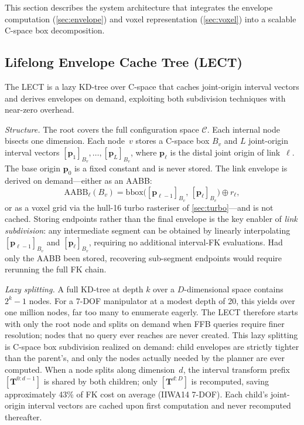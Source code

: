 \documentclass[journal]{IEEEtran}
\newcommand{\Cspace}{\mathcal{C}}
\newcommand{\AABB}{\text{AABB}}
\newcommand{\bT}{\mathbf{T}}
\begin{document}
This section describes the system architecture that integrates
the envelope computation (\cref{sec:envelope}) and voxel representation
(\cref{sec:voxel}) into a scalable C-space box decomposition.

\subsection{Lifelong Envelope Cache Tree (LECT)}\label{sec:lect}

The LECT is a lazy KD-tree over C-space that caches joint-origin
interval vectors and derives envelopes on demand,
exploiting both subdivision techniques with near-zero overhead.

\emph{Structure.}
The root covers the full configuration space $\Cspace$.
Each internal node bisects one dimension.
Each node~$v$ stores a C-space box $B_v$ and $L$ joint-origin
interval vectors $[\bm{p}_1]_{B_v},\ldots,[\bm{p}_L]_{B_v}$,
where $\bm{p}_\ell$ is the distal joint origin of link~$\ell$.
The base origin $\bm{p}_0$ is a fixed constant and is never stored.
The link envelope is derived on demand---either as an AABB:
\begin{equation}\label{eq:lect_aabb}
  \AABB_\ell(B_v)=\mathrm{bbox}\!\bigl([\bm{p}_{\ell-1}]_{B_v},\,[\bm{p}_\ell]_{B_v}\bigr)\oplus r_\ell,
\end{equation}
or as a voxel grid via the hull-16 turbo rasteriser of
\cref{sec:turbo}---and is not cached.
Storing endpoints rather than the final envelope is the key enabler of
\emph{link subdivision}: any intermediate
segment can be obtained by linearly interpolating
$[\bm{p}_{\ell-1}]_{B_v}$ and $[\bm{p}_\ell]_{B_v}$, requiring no
additional interval-FK evaluations.
Had only the AABB been stored, recovering sub-segment endpoints would
require rerunning the full FK chain.

\emph{Lazy splitting.}
A full KD-tree at depth $k$ over a $D$-dimensional space contains
$2^k - 1$ nodes.
For a 7-DOF manipulator at a modest depth of 20, this yields over one
million nodes, far too many to enumerate eagerly.
The LECT therefore starts with only the root node and splits on demand
when FFB queries require finer resolution;
nodes that no query ever reaches are never created.
This lazy splitting is C-space box subdivision realized on demand:
child envelopes are strictly tighter than the parent's, and only the
nodes actually needed by the planner are ever computed.
When a node splits along dimension~$d$, the interval transform prefix
$[\bT^{0:d-1}]$ is shared by both children; only $[\bT^{d:D}]$ is
recomputed, saving approximately 43\% of FK cost on average (IIWA14 7-DOF).
Each child's joint-origin interval vectors are cached upon first
computation and never recomputed thereafter.
\end{document}
